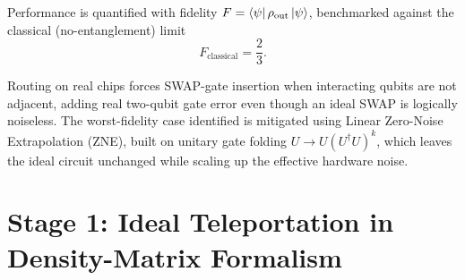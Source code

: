 \documentclass[11pt]{article}
\begin{document}
Performance is quantified with fidelity $F=\bra{\psi}\rho_{\text{out}}\ket{\psi}$, benchmarked against the classical (no-entanglement) limit
\begin{equation}
F_{\text{classical}} = \frac{2}{3}.
\label{eq:classical-limit}
\end{equation}

Routing on real chips forces SWAP-gate insertion when interacting qubits are not adjacent, adding real two-qubit gate error even though an ideal SWAP is logically noiseless. The worst-fidelity case identified is mitigated using Linear Zero-Noise Extrapolation (ZNE), built on unitary gate folding $U\to U(U^\dagger U)^k$, which leaves the ideal circuit unchanged while scaling up the effective hardware noise.

\section{Stage 1: Ideal Teleportation in Density-Matrix Formalism}
\label{sec:stage1-theory}
\end{document}

